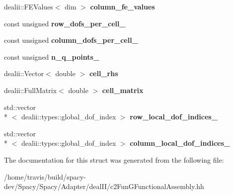 \begin{DoxyCompactItemize}
\item 
\hypertarget{structSpacy_1_1dealII_1_1Detail_1_1LocalAssemblyBase_aaf9d2501f535b337e2d374b41275d5ae}{dealii\-::\-F\-E\-Values$<$ dim $>$ {\bfseries column\-\_\-fe\-\_\-values}}\label{structSpacy_1_1dealII_1_1Detail_1_1LocalAssemblyBase_aaf9d2501f535b337e2d374b41275d5ae}

\item 
\hypertarget{structSpacy_1_1dealII_1_1Detail_1_1LocalAssemblyBase_a996b6952c0fc08aa7f2817c7a4f2b313}{const unsigned {\bfseries row\-\_\-dofs\-\_\-per\-\_\-cell\-\_\-}}\label{structSpacy_1_1dealII_1_1Detail_1_1LocalAssemblyBase_a996b6952c0fc08aa7f2817c7a4f2b313}

\item 
\hypertarget{structSpacy_1_1dealII_1_1Detail_1_1LocalAssemblyBase_a09cc798555d81b9343a4cfd352b4789f}{const unsigned {\bfseries column\-\_\-dofs\-\_\-per\-\_\-cell\-\_\-}}\label{structSpacy_1_1dealII_1_1Detail_1_1LocalAssemblyBase_a09cc798555d81b9343a4cfd352b4789f}

\item 
\hypertarget{structSpacy_1_1dealII_1_1Detail_1_1LocalAssemblyBase_a009993ec7e3c5e38ca44f2dbd160a280}{const unsigned {\bfseries n\-\_\-q\-\_\-points\-\_\-}}\label{structSpacy_1_1dealII_1_1Detail_1_1LocalAssemblyBase_a009993ec7e3c5e38ca44f2dbd160a280}

\item 
\hypertarget{structSpacy_1_1dealII_1_1Detail_1_1LocalAssemblyBase_a407f1e4a2f7d293a61dd295be569d0d2}{dealii\-::\-Vector$<$ double $>$ {\bfseries cell\-\_\-rhs}}\label{structSpacy_1_1dealII_1_1Detail_1_1LocalAssemblyBase_a407f1e4a2f7d293a61dd295be569d0d2}

\item 
\hypertarget{structSpacy_1_1dealII_1_1Detail_1_1LocalAssemblyBase_a4c9f8591abb90e2af136b0c82c3fd973}{dealii\-::\-Full\-Matrix$<$ double $>$ {\bfseries cell\-\_\-matrix}}\label{structSpacy_1_1dealII_1_1Detail_1_1LocalAssemblyBase_a4c9f8591abb90e2af136b0c82c3fd973}

\item 
\hypertarget{structSpacy_1_1dealII_1_1Detail_1_1LocalAssemblyBase_a07f3065dbebecd404259ed7a374544a5}{std\-::vector\\*
$<$ dealii\-::types\-::global\-\_\-dof\-\_\-index $>$ {\bfseries row\-\_\-local\-\_\-dof\-\_\-indices\-\_\-}}\label{structSpacy_1_1dealII_1_1Detail_1_1LocalAssemblyBase_a07f3065dbebecd404259ed7a374544a5}

\item 
\hypertarget{structSpacy_1_1dealII_1_1Detail_1_1LocalAssemblyBase_aa9aee3575f199c88d3414b4f7e53cb26}{std\-::vector\\*
$<$ dealii\-::types\-::global\-\_\-dof\-\_\-index $>$ {\bfseries column\-\_\-local\-\_\-dof\-\_\-indices\-\_\-}}\label{structSpacy_1_1dealII_1_1Detail_1_1LocalAssemblyBase_aa9aee3575f199c88d3414b4f7e53cb26}

\end{DoxyCompactItemize}


The documentation for this struct was generated from the following file\-:\begin{DoxyCompactItemize}
\item 
/home/travis/build/spacy-\/dev/\-Spacy/\-Spacy/\-Adapter/deal\-I\-I/c2\-Fun\-G\-Functional\-Assembly.\-hh\end{DoxyCompactItemize}
